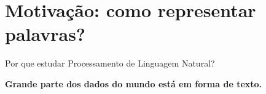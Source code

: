 
\section{Motivação: como representar palavras?}

\begin{frame}{Por que estudar Processamento de Linguagem Natural?}
    \begin{center}
        {\large\color{dexpiBlue}\textbf{Grande parte dos dados do mundo está em forma de texto.}}
    \end{center}


\end{frame}
